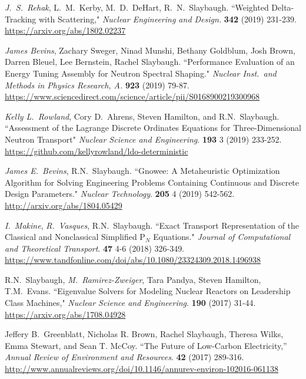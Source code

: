 \begin{bibsection}
\item \textit{J.\ S.\ Rehak}, L.\ M.\ Kerby, M.\ D.\ DeHart, R.\ N.\ Slaybaugh. ``Weighted Delta-Tracking with Scattering," \textit{Nuclear Engineering and Design.} \textbf{342} (2019) 231-239. \\
\url{https://arxiv.org/abs/1802.02237}

\item \textit{James Bevins}, Zachary Sweger, Ninad Munshi, Bethany Goldblum, Josh Brown, Darren Bleuel, Lee Bernstein, Rachel Slaybaugh. ``Performance Evaluation of an Energy Tuning Assembly for Neutron Spectral Shaping." \textit{Nuclear Inst.\ and Methods in Physics Research, A.} \textbf{923} (2019) 79-87.\\
\url{https://www.sciencedirect.com/science/article/pii/S0168900219300968}

\item \textit{Kelly L.\ Rowland}, Cory D.\ Ahrens, Steven Hamilton, and R.N.\ Slaybaugh. ``Assessment of the Lagrange Discrete Ordinates Equations for Three-Dimensional Neutron Transport"  \textit{Nuclear Science and Engineering}. \textbf{193} 3 (2019) 233-252.\\
\url{https://github.com/kellyrowland/ldo-deterministic}

\item \textit{James E.\ Bevins}, R.N.\ Slaybaugh. ``Gnowee: A Metaheuristic Optimization Algorithm for Solving Engineering Problems Containing Continuous and Discrete Design Parameters." \textit{Nuclear Technology}. \textbf{205} 4 (2019) 542-562.\\
\url{http://arxiv.org/abs/1804.05429}

\item \textit{I.\ Makine}, \textit{R.\ Vasques}, R.N.\ Slaybaugh. ``Exact Transport Representation of the Classical and Nonclassical Simplified P$_N$ Equations." \textit{Journal of Computational and Theoretical Transport}. \textbf{47} 4-6 (2018) 326-349.\\
\url{https://www.tandfonline.com/doi/abs/10.1080/23324309.2018.1496938}

\item R.N.\ Slaybaugh, \textit{M.\ Ramirez-Zweiger}, Tara Pandya, Steven Hamilton, T.M.\ Evans. ``Eigenvalue Solvers for Modeling Nuclear Reactors on Leadership Class Machines," \textit{Nuclear Science and Engineering}. \textbf{190} (2017) 31-44.\\
\url{https://arxiv.org/abs/1708.04928}

\item Jeffery B.\ Greenblatt, Nicholas R. Brown, Rachel Slaybaugh, Theresa Wilks, Emma Stewart, and Sean T. McCoy. ``The Future of Low-Carbon Electricity,'' \textit{Annual Review of Environment and Resources}. \textbf{42} (2017) 289-316. \\
\url{http://www.annualreviews.org/doi/10.1146/annurev-environ-102016-061138}


\end{bibsection}
